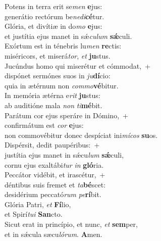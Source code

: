 \evenverse Potens in terra erit se\textit{men} \textbf{e}jus:~\*\\
\evenverse generátio rectórum be\textit{ne}\textit{di}\textbf{cé}tur.\\
\oddverse Glória, et divítiæ in do\textit{mo} \textbf{e}jus:~\*\\
\oddverse et justítia ejus manet in sǽ\textit{cu}\textit{lum} \textbf{sǽ}culi.\\
\evenverse Exórtum est in ténebris lu\textit{men} \textbf{re}ctis:~\*\\
\evenverse miséricors, et miserá\textit{tor}, \textit{et} \textbf{ju}stus.\\
\oddverse Jucúndus homo qui miserétur et cómmodat,~+\\
\oddverse  dispónet sermónes suos in \textit{ju}\textbf{dí}cio:~\*\\
\oddverse quia in ætérnum non \textit{com}\textit{mo}\textbf{vé}bitur.\\
\evenverse In memória ætérna e\textit{rit} \textbf{ju}stus:~\*\\
\evenverse ab auditióne mala \textit{non} \textit{ti}\textbf{mé}bit.\\
\oddverse Parátum cor ejus speráre in Dómino,~+\\
\oddverse  confirmátum est \textit{cor} \textbf{e}jus:~\*\\
\oddverse non commovébitur donec despíciat ini\textit{mí}\textit{cos} \textbf{su}os.\\
\evenverse Dispérsit, dedit paupéribus:~+\\
\evenverse  justítia ejus manet in sǽcu\textit{lum} \textbf{sǽ}culi,~\*\\
\evenverse cornu ejus exaltábi\textit{tur} \textit{in} \textbf{gló}ria.\\
\oddverse Peccátor vidébit, et irascétur,~+\\
\oddverse  déntibus suis fremet et \textit{ta}\textbf{bé}scet:~\*\\
\oddverse desidérium peccató\textit{rum} \textit{pe}\textbf{rí}bit.\\
\evenverse Glória Patri, \textit{et} \textbf{Fí}lio,~\*\\
\evenverse et Spirí\textit{tu}\textit{i} \textbf{San}cto.\\
\oddverse Sicut erat in princípio, et nunc, \textit{et} \textbf{sem}per,~\*\\
\oddverse et in sǽcula sæcu\textit{ló}\textit{rum}. \textbf{A}men.\\

